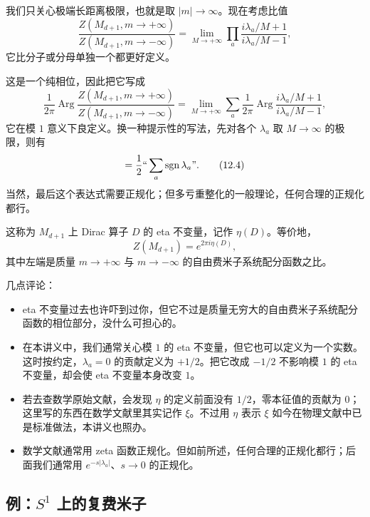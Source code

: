 我们只关心极端长距离极限，也就是取 $|m|\to\infty$。现在考虑比值
\begin{equation}
  \frac{Z(M_{d+1},m\to+\infty)}{Z(M_{d+1},m\to-\infty)}
  =\lim_{M\to+\infty}\prod_a\frac{i\lambda_a/M+1}{i\lambda_a/M-1},
  \tag{12.2}
\end{equation}
它比分子或分母单独一个都更好定义。

这是一个纯相位，因此把它写成
\begin{equation}
  \frac{1}{2\pi}\operatorname{Arg}
  \frac{Z(M_{d+1},m\to+\infty)}{Z(M_{d+1},m\to-\infty)}
  =\lim_{M\to+\infty}\sum_a\frac{1}{2\pi}\operatorname{Arg}
  \frac{i\lambda_a/M+1}{i\lambda_a/M-1},
  \tag{12.3}
\end{equation}
它在模 $1$ 意义下良定义。换一种提示性的写法，先对各个 $\lambda_a$ 取 $M\to\infty$ 的极限，则有
\begin{equation}
  =\frac{1}{2}\text{“}\sum_a\operatorname{sgn}\lambda_a\text{”}.
  \tag{12.4}
\end{equation}
当然，最后这个表达式需要正规化；但多亏重整化的一般理论，任何合理的正规化都行。

这称为 $M_{d+1}$ 上 Dirac 算子 $D$ 的 eta 不变量，记作 $\eta(D)$。等价地，
\begin{equation}
  Z(M_{d+1})=e^{2\pi i\eta(D)},
  \tag{12.5}
\end{equation}
其中左端是质量 $m\to+\infty$ 与 $m\to-\infty$ 的自由费米子系统配分函数之比。

几点评论：

\begin{itemize}
  \item eta 不变量过去也许吓到过你，但它不过是质量无穷大的自由费米子系统配分函数的相位部分，没什么可担心的。
  \item 在本讲义中，我们通常关心模 $1$ 的 eta 不变量，但它也可以定义为一个实数。这时按约定，$\lambda_a=0$ 的贡献定义为 $+1/2$。把它改成 $-1/2$ 不影响模 $1$ 的 eta 不变量，却会使 eta 不变量本身改变 $1$。
  \item 若去查数学原始文献，会发现 $\eta$ 的定义前面没有 $1/2$，零本征值的贡献为 $0$；这里写的东西在数学文献里其实记作 $\xi$。不过用 $\eta$ 表示 $\xi$ 如今在物理文献中已是标准做法，本讲义也照办。
  \item 数学文献通常用 zeta 函数正规化。但如前所述，任何合理的正规化都行；后面我们通常用 $e^{-s|\lambda_a|}$、$s\to0$ 的正规化。
\end{itemize}

\subsection{例：$S^1$ 上的复费米子}

